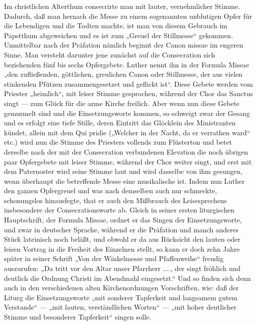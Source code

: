 Im christlichen Alterthum consecrirte man mit lauter, vernehmlicher Stimme. Dadurch, daß man hernach die Messe zu einem sogenannten unblutigen Opfer für die Lebendigen und die Todten machte, ist man von diesem Gebrauch im Papstthum abgeweichen und es ist zum „Greuel der Stillmesse“ gekommen. Unmittelbar nach der Präfation nämlich beginnt der Canon missae
im engeren Sinne. Man versteht darunter jene zunächst auf die Consecration sich beziehenden fünf bis sechs Opfergebete. Luther nennt ihn in der Formula Missae „den zufließenden, göttlichen, greulichen Canon oder Stillmesse, der aus vielen stinkenden Pfützen zusammengesetzet und geflickt ist“. Diese Gebete werden vom Priester „heimlich“, mit leiser Stimme gesprochen, während der Chor das Sanctus singt — zum Glück für die arme Kirche freilich. Aber wenn nun diese Gebete gemurmelt sind und die Einsetzungsworte kommen, so schweigt zwar der Gesang und es erfolgt eine tiefe Stille, deren Eintritt das Glöcklein des Ministranten kündet, allein mit dem Qui pridie („Welcher in der Nacht, da er verrathen ward“ etc.) wird nun die Stimme des Priesters vollends zum Flüsterton und betet derselbe nach der mit der Consecration verbundenen Elevation die noch übrigen paar Opfergebete mit leiser Stimme, während der Chor weiter singt, und erst mit dem Paternoster wird seine Stimme laut und wird dasselbe von ihm gesungen, wenn überhaupt die betreffende Messe eine musikalische ist. Indem nun Luther den ganzen Opfergreuel und was nach demselben auch nur schmeckte, schonungslos hinausfegte, that er auch den Mißbrauch des Leisesprechens insbesondere der Consecrationsworte ab. Gleich in seiner ersten liturgischen Hauptschrift, der Formula Missae, ordnet er das Singen der Einsetzungsworte, und zwar in deutscher Sprache, während er die Präfation und manch anderes Stück lateinisch noch beläßt, und obwohl er da aus Rücksicht den lauten oder leisen Vortrag in die Freiheit des Einzelnen stellt, so kann er doch zehn Jahre später in seiner Schrift „Von der Winkelmesse und Pfaffenweihe“ freudig auszurufen: „Da tritt vor den Altar unser Pfarrherr ...., der singt fröhlich und deutlich die Ordnung Christi im Abendmahl eingesetzt.“ Und so finden sich denn auch in den verschiedenen alten Kirchenordnungen Vorschriften, wie: daß der Liturg die Einsetzungsworte „mit sonderer Tapferkeit und langsamem gutem Verstande“ — „mit lauten, verständlichen Worten“ — „mit hoher deutlicher Stimme und besonderer Tapferkeit“ singen solle.

